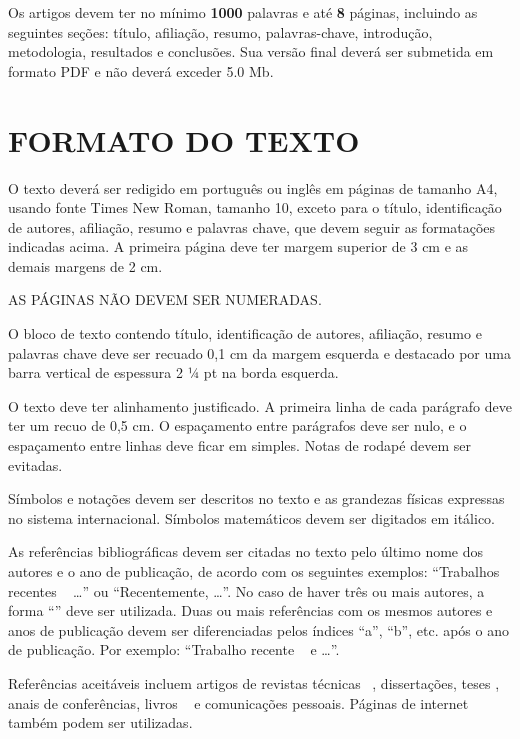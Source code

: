 \documentclass[10pt,fleqn,a4paper,twoside]{article}
\begin{document}
Os artigos devem ter no mínimo {\bf 1000} palavras e até {\bf 8} páginas, incluindo as seguintes seções: título, afiliação, resumo, palavras-chave, introdução, metodologia, resultados e conclusões. Sua versão final deverá ser submetida em formato PDF e não deverá exceder 5.0 Mb.

\section{FORMATO DO TEXTO}

O texto deverá ser redigido em português ou inglês em páginas de tamanho A4, usando fonte Times New Roman, tamanho 10, exceto para o título, identificação de autores, afiliação, resumo e palavras chave, que devem seguir as formatações indicadas acima. A primeira página deve ter margem superior de 3 cm e as demais margens de 2 cm.

AS PÁGINAS NÃO DEVEM SER NUMERADAS.

O bloco de texto contendo título, identificação de autores, afiliação, resumo e palavras chave deve ser recuado 0,1 cm da margem esquerda e destacado por uma barra vertical de espessura 2 ¼ pt na borda esquerda.

O texto deve ter alinhamento justificado. A primeira linha de cada parágrafo deve ter um recuo de 0,5 cm. O espaçamento entre parágrafos deve ser nulo, e o espaçamento entre linhas deve ficar em simples. Notas de rodapé devem ser evitadas.

Símbolos e notações devem ser descritos no texto e as grandezas físicas expressas no sistema internacional. Símbolos matemáticos devem ser digitados em itálico.

As referências bibliográficas devem ser citadas no texto pelo último nome dos autores e o ano de publicação, de acordo com os seguintes exemplos: “Trabalhos recentes ~\citep {BandarraFilho2011} \dots” ou “Recentemente, \citet {BandarraFilho2011} \dots”. No caso de haver três ou mais autores, a forma “\citep {CavaliniJunior2015}” deve ser utilizada. Duas ou mais referências com os mesmos autores e anos de publicação devem ser diferenciadas pelos índices “a”, “b”, etc. após o ano de publicação. Por exemplo: “Trabalho recente ~\citep {Santos2013a} e \citep {Santos2013b} \dots”.

Referências aceitáveis incluem artigos de revistas técnicas ~\citep{MLA04}, dissertações, teses \citep {CavaliniJunior2013, coelho2017}, anais de conferências, livros ~\citep {McConnell.Varoto.2008} e comunicações pessoais. Páginas de internet também podem ser utilizadas.
\end{document}

